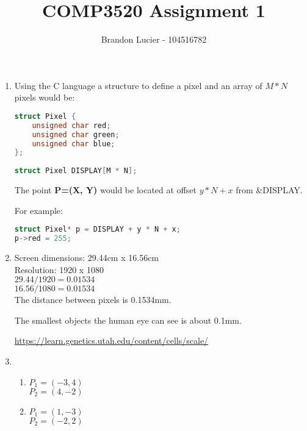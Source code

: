 \documentclass{article}
\title{COMP3520 Assignment 1}
\author{Brandon Lucier - 104516782}
\begin{document}
\maketitle

\begin{enumerate}
    \item{
        Using the C language a structure to define a pixel and an array of $M * N$ pixels would be:
        
        \begin{lstlisting}[language=C]
struct Pixel {
    unsigned char red;
    unsigned char green;
    unsigned char blue;
};
    
struct Pixel DISPLAY[M * N];
        \end{lstlisting}
        
        The point \textbf{P=(X, Y)} would be located at offset $y * N + x$ from \&DISPLAY.
        
        For example:
        
        \begin{lstlisting}[language=C]
struct Pixel* p = DISPLAY + y * N + x;
p->red = 255;
        \end{lstlisting}
    }
    \item{
        Screen dimensions: 29.44cm x 16.56cm\\
        Resolution: 1920 x 1080\\
        $29.44 / 1920 = 0.01534$\\
        $16.56 / 1080 = 0.01534$\\
        The distance between pixels is 0.1534mm.
        
        The smallest objects the human eye can see is about 0.1mm.
        
        \url{https://learn.genetics.utah.edu/content/cells/scale/}
    }
    \item{
        \begin{enumerate}[label=\alph*.]
            \item {
                $P_{1} = (-3, 4)$\\
                $P_{2} = (4, -2)$
                
            }
            \item {
                $P_{1} = (1, -3)$\\
                $P_{2} = (-2, 2)$
                
}
\end{enumerate}}
\end{enumerate}
\end{document}
